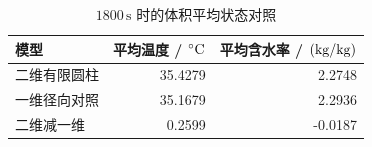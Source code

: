 \begin{table}[H]
\centering\small
\caption{$1800\,\mathrm{s}$ 时的体积平均状态对照}\label{tab:means}
\begin{tabular}{lrr}
\toprule
模型 & 平均温度 / $\celsius$ & 平均含水率 / $(\kgkg)$\\
\midrule
二维有限圆柱 & 35.4279 & 2.2748 \\
一维径向对照 & 35.1679 & 2.2936 \\
二维减一维 & 0.2599 & -0.0187 \\
\bottomrule
\end{tabular}
\end{table}
